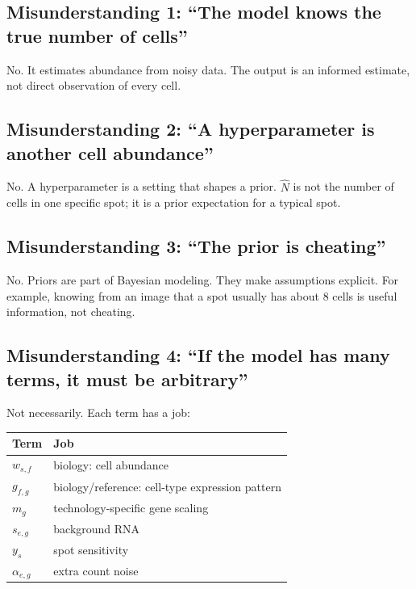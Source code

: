 \documentclass[11pt]{article}
\begin{document}
\subsection{Misunderstanding 1: ``The model knows the true number of cells''}

No. It estimates abundance from noisy data. The output is an informed estimate, not direct observation of every cell.

\subsection{Misunderstanding 2: ``A hyperparameter is another cell abundance''}

No. A hyperparameter is a setting that shapes a prior. $\hat N$ is not the number of cells in one specific spot; it is a prior expectation for a typical spot.

\subsection{Misunderstanding 3: ``The prior is cheating''}

No. Priors are part of Bayesian modeling. They make assumptions explicit. For example, knowing from an image that a spot usually has about 8 cells is useful information, not cheating.

\subsection{Misunderstanding 4: ``If the model has many terms, it must be arbitrary''}

Not necessarily. Each term has a job:

\begin{center}
\begin{tabular}{ll}
\toprule
Term & Job \\
\midrule
$w_{s,f}$ & biology: cell abundance \\
$g_{f,g}$ & biology/reference: cell-type expression pattern \\
$m_g$ & technology-specific gene scaling \\
$s_{e,g}$ & background RNA \\
$y_s$ & spot sensitivity \\
$\alpha_{e,g}$ & extra count noise \\
\bottomrule
\end{tabular}
\end{center}
\end{document}
